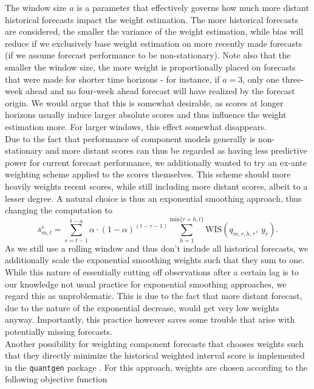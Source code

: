 The window size $a$ is a parameter that effectively governs how much more distant historical forecasts impact the weight estimation. The more historical forecasts are considered, the smaller the variance of the weight estimation, while bias will reduce if we exclusively base weight estimation on more recently made forecasts (if we assume forecast performance to be non-stationary). Note also that the smaller the window size, the more weight is proportionally placed on forecasts that were made for shorter time horizons - for instance, if $a = 3$, only one three-week ahead and no four-week ahead forecast will have realized by the forecast origin. We would argue that this is somewhat desirable, as scores at longer horizons usually induce larger absolute scores and thus influence the weight estimation more. For larger windows, this effect somewhat disappears.\\
Due to the fact that performance of component models generally is non-stationary and more distant scores can thus be regarded as having less predictive power for current forecast performance, we additionally wanted to try an ex-ante weighting scheme applied to the scores themselves. This scheme should more heavily weights recent scores, while still including more distant scores, albeit to a lesser degree. A natural choice is thus an exponential smoothing approach, thus changing the computation to\\
\begin{equation}
\bar{s}_{m,t}^{e} = \sum_{r = t-1}^{t-a} \alpha \cdot (1-\alpha)^{(t-r-1)} \sum_{h = 1}^{\text{min}\{r+h, t\}} \text{WIS}(q_{m, r, h, \tau}, \ y_r).
\end{equation}
As we still use a rolling window and thus don't include all historical forecasts, we additionally scale the exponential smoothing weights such that they sum to one. While this nature of essentially cutting off observations after a certain lag is to our knowledge not usual practice for exponential smoothing approaches, we regard this as unproblematic. This is due to the fact that more distant forecast, due to the nature of the exponential decrease, would get very low weights anyway. Importantly, this practice however saves some trouble that arise with potentially missing forecasts. \\ 
Another possibility for weighting component forecasts that chooses weights such that they directly minimize the historical weighted interval score is implemented in the \texttt{quantgen} package \cite{tibshirani_quantgen_2020}. For this approach, weights are chosen according to the following objective function \\
